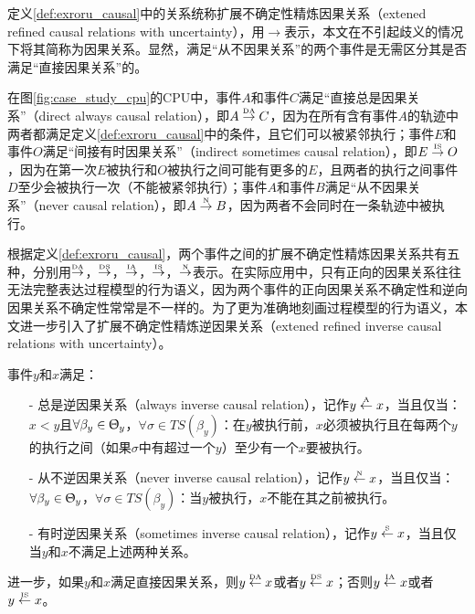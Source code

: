 定义\ref{def:exroru_causal}中的关系统称扩展不确定性精炼因果关系（extened refined causal relations with uncertainty），用$\rightarrow$表示，本文在不引起歧义的情况下将其简称为因果关系。显然，满足“从不因果关系”的两个事件是无需区分其是否满足“直接因果关系”的。

\begin{example}\label{ex:exroru_causal}
在图\ref{fig:case_study_cpu}的CPU中，事件$A$和事件$C$满足“直接总是因果关系”（direct always causal relation），即$A\overset{\text{\tiny{DA}}}{\rightarrow}C$，因为在所有含有事件$A$的轨迹中两者都满足定义\ref{def:exroru_causal}中的条件，且它们可以被紧邻执行；事件$E$和事件$O$满足“间接有时因果关系”（indirect sometimes causal relation），即$E\overset{\text{\tiny{IS}}}{\rightarrow}O$，因为在第一次$E$被执行和$O$被执行之间可能有更多的$E$，且两者的执行之间事件$D$至少会被执行一次（不能被紧邻执行）；事件$A$和事件$B$满足“从不因果关系”（never causal relation），即$A\overset{\text{\tiny{N}}}{\rightarrow}B$，因为两者不会同时在一条轨迹中被执行。
\end{example}

根据定义\ref{def:exroru_causal}，两个事件之间的扩展不确定性精炼因果关系共有五种，分别用$\overset{\text{\tiny{DA}}}{\rightarrow}$，$\overset{\text{\tiny{DS}}}{\rightarrow}$，$\overset{\text{\tiny{IA}}}{\rightarrow}$，$\overset{\text{\tiny{IS}}}{\rightarrow}$，$\overset{\text{\tiny{N}}}{\rightarrow}$表示。在实际应用中，只有正向的因果关系往往无法完整表达过程模型的行为语义，因为两个事件的正向因果关系不确定性和逆向因果关系不确定性常常是不一样的。为了更为准确地刻画过程模型的行为语义，本文进一步引入了扩展不确定性精炼逆因果关系（extened refined inverse causal relations with uncertainty）。

\begin{definition}[事件间扩展不确定性精炼逆因果关系]\label{def:exroru_inverse_causal}
事件$y$和$x$满足：
  \begin{itemize}
  	\item[-] 总是逆因果关系（always inverse causal relation），记作$y\overset{\text{\tiny{A}}}{\leftarrow}x$，当且仅当：$x<y$且$\forall\beta_{y}\in\Uptheta_{y}$，$\forall\sigma\in TS(\beta_{y})$：在$y$被执行前，$x$必须被执行且在每两个$y$的执行之间（如果$\sigma$中有超过一个$y$）至少有一个$x$要被执行。
  	\item[-] 从不逆因果关系（never inverse causal relation），记作$y\overset{\text{\tiny{N}}}{\leftarrow}x$，当且仅当：$\forall\beta_{y}\in\Uptheta_{y}$，$\forall\sigma\in TS(\beta_{y})$：当$y$被执行，$x$不能在其之前被执行。
  	\item[-] 有时逆因果关系（sometimes inverse causal relation），记作$y\overset{\text{\tiny{S}}}{\leftarrow}x$，当且仅当$y$和$x$不满足上述两种关系。
  \end{itemize}
进一步，如果$y$和$x$满足直接因果关系，则$y\overset{\text{\tiny{DA}}}{\leftarrow}x$或者$y\overset{\text{\tiny{DS}}}{\leftarrow}x$；否则$y\overset{\text{\tiny{IA}}}{\leftarrow}x$或者$y\overset{\text{\tiny{IS}}}{\leftarrow}x$。
\end{definition}

